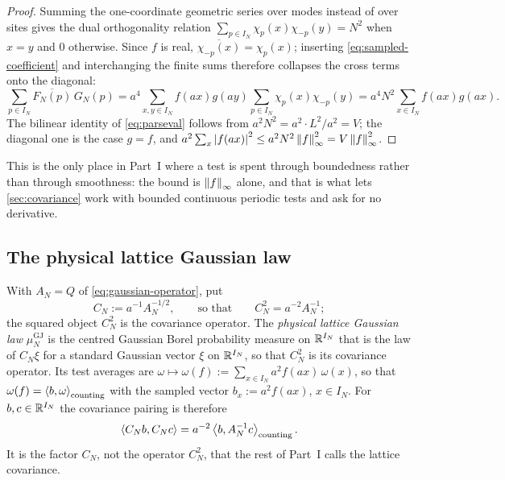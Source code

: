 \begin{proof}
Summing the one-coordinate geometric series over modes instead of over sites gives the dual orthogonality
relation $\sum_{p\in I_N}\chi_p(x)\chi_{-p}(y)=N^2$ when $x=y$ and $0$ otherwise. Since $f$ is real,
$\overline{\chi_{-p}(x)}=\chi_p(x)$; inserting \eqref{eq:sampled-coefficient} and interchanging the finite
sums therefore collapses the cross terms onto the diagonal:
\[
  \sum_{p\in I_N}\overline{F_N(p)}\,G_N(p)
  =a^4\!\!\sum_{x,y\in I_N}\!\!f(ax)g(ay)\sum_{p\in I_N}\chi_p(x)\chi_{-p}(y)
  =a^4N^2\sum_{x\in I_N}f(ax)g(ax).
\]
The bilinear identity of \eqref{eq:parseval} follows from $a^2N^2=a^2\cdot L^2/a^2=V$; the diagonal one is
the case $g=f$, and $a^2\sum_x\left| f(ax) \right|^2\le a^2N^2\left\| f \right\|_\infty^2=V\left\| f \right\|_\infty^2$.
\end{proof}

This is the only place in Part~I where a test is spent through boundedness rather than through smoothness:
the bound is $\left\| f \right\|_\infty$ alone, and that is what lets \cref{sec:covariance} work with bounded
continuous periodic tests and ask for no derivative.

\subsection{The physical lattice Gaussian law}

\begin{definition}\label{def:gj-measure}
With $A_N=Q$ of \eqref{eq:gaussian-operator}, put
\begin{equation}\label{eq:gj-covariance}
  C_N:=a^{-1}A_N^{-1/2},\qquad\text{so that}\qquad C_N^2=a^{-2}A_N^{-1};
\end{equation}
the squared object $C_N^2$ is the covariance operator. The \emph{physical lattice Gaussian law}
$\mu^{\mathrm{GJ}}_N$ is the centred Gaussian Borel probability measure on $\mathbb{R}^{I_N}$ that is the law of
$C_N\xi$ for a standard Gaussian vector $\xi$ on $\mathbb{R}^{I_N}$, so that $C_N^2$ is its covariance operator. Its
test averages are
$\omega\mapsto\omega(f):=\sum_{x\in I_N}a^2f(ax)\,\omega(x)$, so that
$\omega(f)=\left\langle b, \omega \right\rangle_{\mathrm{counting}}$ with the sampled vector $b_x:=a^2f(ax)$, $x\in I_N$. For
$b,c\in\mathbb{R}^{I_N}$ the covariance pairing is therefore
\begin{equation}\label{eq:gj-pairing}
  \left\langle C_Nb, C_Nc \right\rangle=a^{-2}\left\langle b, A_N^{-1}c \right\rangle_{\mathrm{counting}} .
\end{equation}
It is the factor $C_N$, not the operator $C_N^2$, that the rest of Part~I calls the lattice covariance.
\end{definition}

